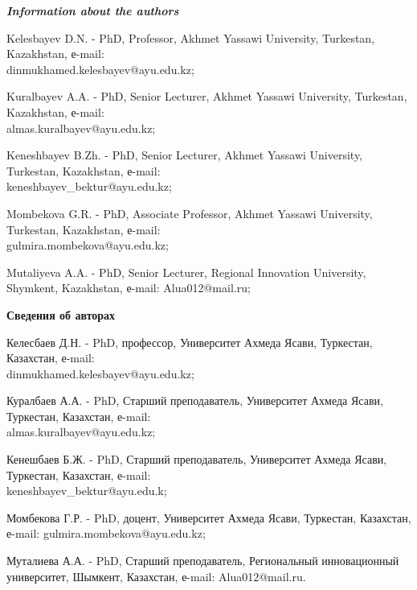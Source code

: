 \begin{authorinfo}
\emph{{\bfseries Information about the authors}}

Kelesbayev D.N. - PhD, Professor, Akhmet Yassawi University, Turkestan,
Kazakhstan, е-mail: \\dinmukhamed.kelesbayev@ayu.edu.kz;

Kuralbayev A.A. - PhD, Senior Lecturer, Akhmet Yassawi University,
Turkestan, Kazakhstan, е-mail: \\almas.kuralbayev@ayu.edu.kz;

Keneshbayev B.Zh. - PhD, Senior Lecturer, Akhmet Yassawi University,
Turkestan, Kazakhstan, е-mail: \\keneshbayev\_bektur@ayu.edu.kz;

Mombekova G.R. - PhD, Associate Professor, Akhmet Yassawi University,
Turkestan, Kazakhstan, е-mail: \\gulmira.mombekova@ayu.edu.kz;

Mutaliyeva A.A. - PhD, Senior Lecturer, Regional Innovation University,
Shymkent, Kazakhstan, е-mail: Alua012@mail.ru;

{\bfseries Сведения об авторах}

Келесбаев Д.Н. - PhD, профессор, Университет Ахмеда Ясави, Туркестан,
Казахстан, е-mail: \\dinmukhamed.kelesbayev@ayu.edu.kz;

Куралбаев А.А. - PhD, Старший преподаватель, Университет Ахмеда Ясави,
Туркестан, Казахстан, е-mail: \\almas.kuralbayev@ayu.edu.kz;

Кенешбаев Б.Ж. - PhD, Старший преподаватель, Университет Ахмеда Ясави,
Туркестан, Казахстан, е-mail: \\keneshbayev\_bektur@ayu.edu.k;

Момбекова Г.Р. - PhD, доцент, Университет Ахмеда Ясави, Туркестан,
Казахстан, е-mail: gulmira.mombekova@ayu.edu.kz;

Муталиева А.А. - PhD, Старший преподаватель, Региональный инновационный
университет, Шымкент, Казахстан, е-mail: Alua012@mail.ru.
\end{authorinfo}
